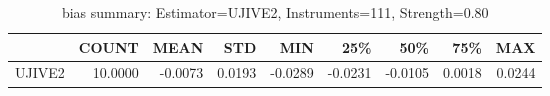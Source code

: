 \begin{table}[ht]
\centering
\caption{bias summary: Estimator=UJIVE2, Instruments=111, Strength=0.80}
\begin{tabular}{lrrrrrrrr}
\toprule
 & COUNT & MEAN & STD & MIN & 25\% & 50\% & 75\% & MAX \\
\midrule
UJIVE2 & 10.0000 & -0.0073 & 0.0193 & -0.0289 & -0.0231 & -0.0105 & 0.0018 & 0.0244 \\
\bottomrule
\end{tabular}
\end{table}

